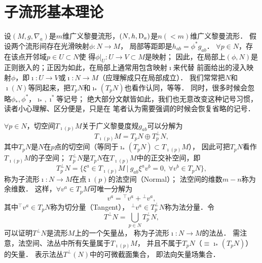 \section{子流形基本理论}
设$(M,g,\nabla_a)$是$m$维广义黎曼流形，$(N,h,{\rm D}_a)$是$n(<m)$维广义黎曼流形．
假设两个流形间存在光滑映射$\phi:N \to M$，
局部等距即是$h_{ab}=\phi^* {g}_{ab}$．
$\forall p\in N$，存在该点开邻域$p \in {U}\subset N$使
得$\phi|_{U}: {U}\to {V}\subset {M}$是映射；
因此，在局部上$(\phi,N)$是正则嵌入的；正因为如此，在局部上通常用包含映射$\imath$来代替
前面给出的浸入映射$\phi$，即$\imath:{U}\to {V}$或$\imath:N \to {M}$（应理解成只在局部成立）．
我们常常把$N$和$\imath(N)$等同起来，把$T_pN$和$\imath_* (T_p N)$也看作认同，等等．
同时，很多时候会忽略$\phi_{*},\phi^{*}$，$\imath_*,\imath^*$等记号；
绝大部分文献皆如此，我们也无意改变这种记号习惯，读者小心理解、区分便是，只是在
笔者认为需要强调的时候会恢复省略的记号．


$\forall p\in N$，切空间$T_{\imath(p)} M$关于广义黎曼度规${g}_{ab}$可以分解为
\begin{equation}
    T_{\imath(p)}{M} = T_pN \oplus T_p^\bot N ,
\end{equation}
其中$T_pN$是$N$在$p$点的切空间（等同于$\imath_* (T_pN)\subset T_{\imath(p)}{M}$），
因此可把$T_pN$看作$T_{\imath(p)} M $的子空间；
$T_p^\bot N$是$T_pN$在$T_{\imath(p)}{M}$中的正交补空间，即
\begin{equation}\label{chsm:eqn_orthogonal-decomposition-TN-TbN}
    T_p^\bot N=\bigl\{ \xi^a \in T_{\imath(p)}{M}\ |\
    {g}_{ab}\xi^a v^b=0,\ \forall v^b\in T_pN \bigr\} ,
\end{equation}
称为子流形$\imath : N\to {M}$在点$\imath(p)$的{\heiti 法空间}（Normal）；
法空间的维数$m-n$称为{\heiti 余维数}．
这样，$\forall v^a\in T_p{M}$可唯一分解为
\begin{equation}\label{chsm:eqn_orthogonal-decomposition}
    v^a = {}^\top v^{a} + {}^\bot v {^a} ,
\end{equation}
其中${}^\top v^{a} \in T_pN$称为切分量（Tangent），
${}^\bot v {^a} \in T_p^\bot N$称为法分量．令
\begin{equation}
    T^\bot N = \bigcup_{p\in N} T_p^\bot N ,
\end{equation}
可以证明$T^\bot N$是流形${M}$上的一个矢量丛，
称为子流形$\imath : N\to {M}$的{\heiti 法丛}．
需注意，法空间、法丛中所有矢量属于$T_{\imath(p)}{M}$，
并且不属于$T_pN$（$\equiv\imath_*(T_pN)$）的矢量．
表示法丛$T^\bot(N)$中的可微截面集合，
即法向矢量场集合．

